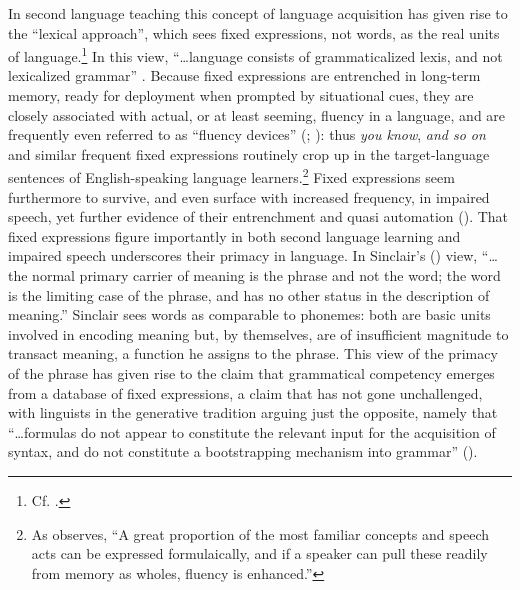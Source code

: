 \documentclass[english,output=paper,colorlinks,citecolor=brown]{../langscibook}
\begin{document}
In second language teaching this concept of language acquisition has given rise to the ``lexical approach'', which sees fixed expressions, not words, as the real units of language.\footnote{Cf. \citealt{Lewis1993}.} In this view, “…language consists of grammaticalized lexis, and not lexicalized grammar” \citep[63]{MacKenzie2000Utterances}. Because fixed expressions are entrenched in long-term memory, ready for deployment when prompted by situational cues, they are closely associated with actual, or at least seeming, fluency in a language, and are frequently even referred to as ``fluency devices'' (\citealt[174]{MacKenzie2000Improvisation}; \citealt[3]{Wood2002}): thus \textit{you know}, \textit{and so on} and similar frequent fixed expressions routinely crop up in the target-language sentences of English-speaking language learners.\footnote{As \citet[7]{Wood2002} observes, “A great proportion of the most familiar concepts and speech acts can be expressed formulaically, and if a speaker can pull these readily from memory as wholes, fluency is enhanced.”} Fixed expressions seem furthermore to survive, and even surface with increased frequency, in impaired speech, yet further evidence of their entrenchment and quasi automation (\citealt[xxiv]{GrangerMeunier2008}). That fixed expressions figure importantly in both second language learning and impaired speech underscores their primacy in language. In Sinclair’s (\citeyear[409]{Sinclair2008}) view, “…the normal primary carrier of meaning is the phrase and not the word; the word is the limiting case of the phrase, and has no other status in the description of meaning.” Sinclair sees words as comparable to phonemes: both are basic units involved in encoding meaning but, by themselves, are of insufficient magnitude to transact meaning, a function he assigns to the phrase. This view of the primacy of the phrase has given rise to the claim that grammatical competency emerges from a database of fixed expressions, a claim that has not gone unchallenged, with linguists in the generative tradition arguing just the opposite, namely that “…formulas do not appear to constitute the relevant input for the acquisition of syntax, and do not constitute a bootstrapping mechanism into grammar” (\citealt[85]{Bardovi-HarligStringer2017}).
\end{document}
